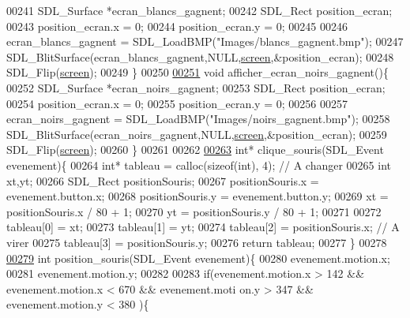 \begin{DoxyCode}
00241         SDL\_Surface *ecran\_blancs\_gagnent;
00242         SDL\_Rect position\_ecran;
00243         position\_ecran.x = 0;
00244         position\_ecran.y = 0;
00245 
00246         ecran\_blancs\_gagnent = SDL\_LoadBMP(\textcolor{stringliteral}{"Images/blancs\_gagnent.bmp"});
00247         SDL\_BlitSurface(ecran\_blancs\_gagnent,NULL,\hyperlink{fonction_interface_8h_a78fa3957d73de49cb81d047857504218}{screen},&position\_ecran);
00248         SDL\_Flip(\hyperlink{fonction_interface_8h_a78fa3957d73de49cb81d047857504218}{screen});
00249 \}
00250 
\hypertarget{fonction_interface_8c_source_l00251}{}\hyperlink{fonction_interface_8h_a4eaec2179ee4e6fc89c1c06b74e94cb4}{00251} \textcolor{keywordtype}{void} afficher\_ecran\_noirs\_gagnent()\{
00252         SDL\_Surface *ecran\_noirs\_gagnent;
00253         SDL\_Rect position\_ecran;
00254         position\_ecran.x = 0;
00255         position\_ecran.y = 0;
00256 
00257         ecran\_noirs\_gagnent = SDL\_LoadBMP(\textcolor{stringliteral}{"Images/noirs\_gagnent.bmp"});
00258         SDL\_BlitSurface(ecran\_noirs\_gagnent,NULL,\hyperlink{fonction_interface_8h_a78fa3957d73de49cb81d047857504218}{screen},&position\_ecran);
00259         SDL\_Flip(\hyperlink{fonction_interface_8h_a78fa3957d73de49cb81d047857504218}{screen});
00260 \}
00261 
00262 
\hypertarget{fonction_interface_8c_source_l00263}{}\hyperlink{fonction_interface_8h_af90df7e39dda6c350185ce94e31fb93c}{00263} \textcolor{keywordtype}{int}* clique\_souris(SDL\_Event evenement)\{
00264         \textcolor{keywordtype}{int}* tableau = calloc(\textcolor{keyword}{sizeof}(\textcolor{keywordtype}{int}), 4); \textcolor{comment}{// A changer}
00265         \textcolor{keywordtype}{int} xt,yt;
00266         SDL\_Rect positionSouris;
00267         positionSouris.x = evenement.button.x;
00268         positionSouris.y = evenement.button.y;
00269         xt = positionSouris.x / 80 + 1;
00270         yt = positionSouris.y / 80 + 1;
00271 
00272         tableau[0] = xt;
00273         tableau[1] = yt;
00274         tableau[2] = positionSouris.x; \textcolor{comment}{// A virer}
00275         tableau[3] = positionSouris.y;
00276         \textcolor{keywordflow}{return} tableau;
00277 \}
00278 
\hypertarget{fonction_interface_8c_source_l00279}{}\hyperlink{fonction_interface_8h_a22f816def98b98aae351ce6087c763ef}{00279} \textcolor{keywordtype}{int} position\_souris(SDL\_Event evenement)\{
00280         evenement.motion.x;
00281         evenement.motion.y;
00282 
00283         \textcolor{keywordflow}{if}(evenement.motion.x > 142 && evenement.motion.x < 670 && evenement.moti
      on.y > 347 && evenement.motion.y < 380 )\{

\end{DoxyCode}
